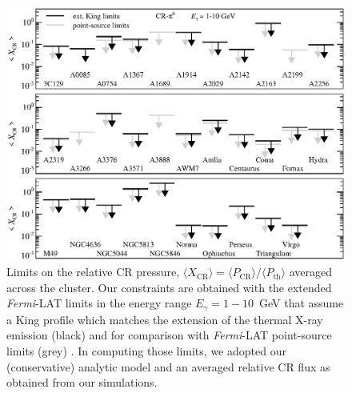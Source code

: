 \documentclass[10pt,aps,pra,reprint,amsmath,amsfonts,amssymb,showpacs,nofootinbib,floatfix]{revtex4-1}
\newcommand{\Fermi}{{\em Fermi}\xspace}
\newcommand{\rmn}{\mathrm}
\newcommand{\bra}{\langle}
\newcommand{\ket}{\rangle}
\begin{document}
{\begin{figure}
\begin{minipage}{2.0\columnwidth}
  \includegraphics[width=0.99\columnwidth]{figures/XCR.Fermi.eps}
  \caption{Limits on the relative CR pressure, $\bra
    X_\rmn{CR}\ket = \bra P_\rmn{CR} \ket / \bra P_\rmn{th}\ket$
    averaged across the cluster. Our constraints are obtained with the
    extended \Fermi-LAT limits in the energy range $E_\gamma=1-10$~GeV
    that assume a King profile which matches the extension of the
    thermal X-ray emission (black) and for comparison with \Fermi-LAT
    point-source limits (grey) \cite{2010ApJ...717L..71A}. In
    computing those limits, we adopted our (conservative) analytic
    model \cite{2010MNRAS.409..449P} and an averaged relative CR flux
    as obtained from our simulations.}
 \label{fig:XCR}
\end{minipage}
\end{figure}

}
\end{document}
